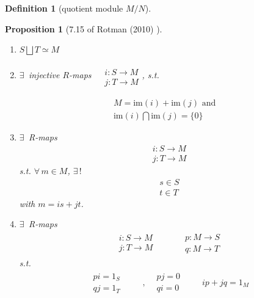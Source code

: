 \documentclass[10pt]{amsart}
\newtheorem{proposition}{Proposition}
\newtheorem{definition}{Definition}
\begin{document}
\begin{multicols*}{2}
\begin{definition}[quotient module $M/N$]
\end{definition}


\begin{proposition}[7.15 of Rotman (2010) \cite{JRotman2010}]  
\begin{enumerate}
\item[(i)] $S \bigsqcup T \simeq M$ 
\item[(ii)] $\exists \, $ injective $R$-maps $\begin{aligned} & \quad \\ 
	& i : S\to M \\ 
& j :T \to M \end{aligned}$, s.t. 

\begin{equation}
\begin{gathered} 
M = \text{im}(i) + \text{im}(j)  \text{ and } \\ 
\text{im}(i) \bigcap \text{im}(j) = \lbrace 0 \rbrace  
\end{gathered}
\end{equation}
\item[(iii)] $\exists \, $ R-maps 
\[
\begin{aligned}
	& i : S\to M \\ 
	& j : T\to M 
\end{aligned}
\]
s.t. $\forall \, m \in M$, $\exists \, !$ 
\[
\begin{aligned}
	& s \in S \\ 
	& t \in T 
\end{aligned}
\] with $m=is + jt$.  
\item[(iv)] $\exists \, $ R-maps 
\[
\begin{gathered}
\begin{aligned}  & i: S\to M \\ 
& j:T \to M \end{aligned} \qquad \, \begin{aligned}
& p : M \to S \\ 
& q : M \to T \end{aligned}
\end{gathered}
\]
s.t. 
\[
\begin{gathered}
	\begin{aligned}
	& pi = 1_S \\ 
& qj = 1_T 
\end{aligned} \qquad \ , \begin{aligned}
	& pj = 0  \\
	& qi = 0 
\end{aligned} \qquad \, ip + jq = 1_M
\end{gathered}
\]
\end{enumerate}
\end{proposition}


\end{multicols*}
\end{document}
